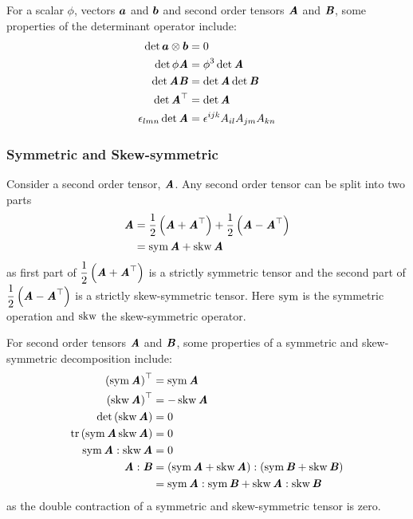 For a scalar $\phi$, vectors $\boldsymbol{a}$ and $\vect{b}$ and second order
tensors $\boldsymbol{\mathit{A}}$ and $\boldsymbol{\mathit{B}}$, some properties of the determinant operator include:
\begin{align}
  \det  \boldsymbol{a} \otimes \boldsymbol{b} &=0 \\
  \det \phi\boldsymbol{\mathit{A}}&=\phi^{3}\det \boldsymbol{\mathit{A}} \\
  \det \boldsymbol{\mathit{A}}\boldsymbol{\mathit{B}}&=\det \boldsymbol{\mathit{A}}\det \boldsymbol{\mathit{B}}\\
  \det  {\ensuremath{\boldsymbol{\mathit{A}}}}^{ \top } &=\det \boldsymbol{\mathit{A}} \\
    \epsilon _{{l}{m}{n}} \det \boldsymbol{\mathit{A}}&=  \epsilon ^{{i}{j}{k}} A_{il}A_{jm}A_{kn}
\end{align}

\subsubsection{Symmetric and Skew-symmetric}
\label{subsubsec:SymmetricSkew}

Consider a second order tensor, $\boldsymbol{\mathit{A}}$. Any second order tensor can be
split into two parts \ie
\begin{align}
  \boldsymbol{\mathit{A}}&=\frac{1}{2}\left( \boldsymbol{\mathit{A}}+ {\boldsymbol{\mathit{A}}}^{ \top }  \right)+\frac{1}{2}\left( \boldsymbol{\mathit{A}}- {\boldsymbol{\mathit{A}}}^{ \top }  \right)
  \notag \\
  &= \operatorname{sym} \boldsymbol{\mathit{A}} + \operatorname{skw} \boldsymbol{\mathit{A}} 
\end{align}
as first part of $\dfrac{1}{2}\left( \boldsymbol{\mathit{A}}+ {\boldsymbol{\mathit{A}}}^{ \top }  \right)$ is a
strictly symmetric tensor and the second part of
$\dfrac{1}{2}\left( \boldsymbol{\mathit{A}}- {\boldsymbol{\mathit{A}}}^{ \top }  \right)$ is a strictly
skew-symmetric tensor. Here $ \operatorname{sym}  $ is the symmetric operation and $ \operatorname{skw}  $ the
skew-symmetric operator.

For second order tensors $\boldsymbol{\mathit{A}}$ and $\boldsymbol{\mathit{B}}$, some properties of a symmetric and skew-symmetric decomposition include:
\begin{align}
  \transpose{\pbrac{\symmetric{\tensor{A}}}}&=\symmetric{\tensor{A}} \\
  \transpose{\pbrac{\skewsym{\tensor{A}}}}&=-\skewsym{\tensor{A}} \\
  \determinant{\pbrac{\skewsym{\tensor{A}}}}&=0 \\
  \trace{}{\pbrac{\symmetric{\tensor{A}}\skewsym{\tensor{A}}}}&=0\\
  \doubledotprod{\symmetric{\tensor{A}}}{\skewsym{\tensor{A}}}&=0\\
  \doubledotprod{\tensor{A}}{\tensor{B}}&=\doubledotprod{\pbrac{\symmetric{\tensor{A}}+\skewsym{\tensor{A}}}}{\pbrac{\symmetric{\tensor{B}}+\skewsym{\tensor{B}}}} \\
  &=\doubledotprod{\symmetric{\tensor{A}}}{\symmetric{\tensor{B}}}+\doubledotprod{\skewsym{\tensor{A}}}{\skewsym{\tensor{B}}}
\end{align}
as the double contraction of a symmetric and skew-symmetric tensor is zero.

